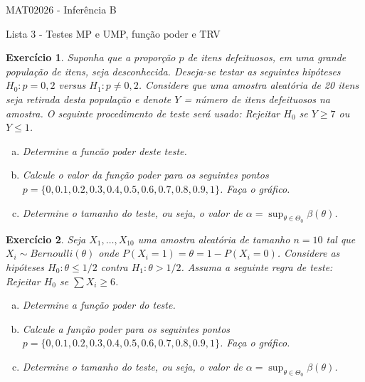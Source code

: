 \documentclass[letter,11pt]{article}
\newtheorem{exer}{Exercício}
\begin{document}
\begin{center}{ \Large MAT02026 - Inferência B }\end{center}

\begin{center}
{\large  \sc Lista 3 - Testes MP e UMP, função poder e TRV}
\end{center}
\vspace{5mm}

\begin{exer} \rm
Suponha que a proporção $p$ de itens defeituosos, em uma grande população de itens,
seja desconhecida. Deseja-se testar as seguintes hipóteses $H_0 : p = 0,2$ versus
$H_1 : p \neq 0,2$. Considere que uma amostra aleatória de 20 itens seja retirada
desta população e denote $Y$ = número de itens defeituosos na amostra. O seguinte
procedimento de teste será usado: Rejeitar $H_0$ se $Y \geq 7$ ou $Y \leq 1$.
\begin{enumerate}[a)]
  \item Determine a funcão poder deste teste.
  \item Calcule o valor da função poder para os seguintes pontos
  $p = \{0, 0.1, 0.2, 0.3, 0.4, 0.5, 0.6, 0.7, 0.8, 0.9, 1\}$. Faça o gráfico.
  \item Determine o tamanho do teste, ou seja, o valor de $\alpha = \sup_{\theta
  \in\Theta_0} \beta(\theta)$.
\end{enumerate}
\end{exer}


\begin{exer} \rm
Seja $X_1, \ldots, X_{10} $ uma amostra aleatória de tamanho $n = 10$ tal que
$X_i \sim Bernoulli(\theta)$ onde $P(X_i = 1) = \theta = 1 - P(X_i = 0)$.
Considere as hipóteses $H_0 : \theta \leq 1/2$ contra $H_1 : \theta > 1/2$.
Assuma a seguinte regra de teste: Rejeitar $H_0$ se $\sum X_i \geq 6$.
\begin{enumerate}[a)]
  \item Determine a função poder do teste.
  \item Calcule a função poder para os seguintes pontos $p = \{0, 0.1, 0.2, 0.3, 0.4, 0.5, 0.6, 0.7, 0.8, 0.9, 1\}$. Faça o gráfico.
  \item Determine o tamanho do teste, ou seja, o valor de $\alpha = \sup_{\theta \in\Theta_0} \beta(\theta)$.
\end{enumerate}
\end{exer}
\end{document}
